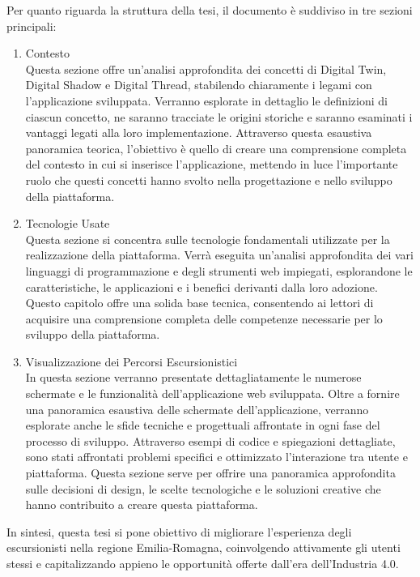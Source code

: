Per quanto riguarda la struttura della tesi, il documento è suddiviso in tre sezioni principali:
\newpage
\begin{enumerate}
    \item Contesto \\
    Questa sezione offre un'analisi approfondita dei concetti di Digital Twin, Digital Shadow e Digital Thread, stabilendo chiaramente i legami con l'applicazione sviluppata. Verranno esplorate in dettaglio le definizioni di ciascun concetto, ne saranno tracciate le origini storiche e saranno esaminati i vantaggi legati alla loro implementazione. Attraverso questa esaustiva panoramica teorica, l'obiettivo è quello di creare una comprensione completa del contesto in cui si inserisce l'applicazione, mettendo in luce l'importante ruolo che questi concetti hanno svolto nella progettazione e nello sviluppo della piattaforma.
    
    \item Tecnologie Usate \\
    Questa sezione si concentra sulle tecnologie fondamentali utilizzate per la realizzazione della piattaforma. Verrà eseguita un'analisi approfondita dei vari linguaggi di programmazione e degli strumenti web impiegati, esplorandone le caratteristiche, le applicazioni e i benefici derivanti dalla loro adozione. Questo capitolo offre una solida base tecnica, consentendo ai lettori di acquisire una comprensione completa delle competenze necessarie per lo sviluppo della piattaforma.
    
    \item Visualizzazione dei Percorsi Escursionistici \\
    In questa sezione verranno presentate dettagliatamente le numerose schermate e le funzionalità dell'applicazione web sviluppata.
    Oltre a fornire una panoramica esaustiva delle schermate dell'applicazione, verranno esplorate anche le sfide tecniche e progettuali affrontate in ogni fase del processo di sviluppo. Attraverso esempi di codice e spiegazioni dettagliate, sono stati affrontati problemi specifici e ottimizzato l'interazione tra utente e piattaforma.
    Questa sezione serve per offrire una panoramica approfondita sulle decisioni di design, le scelte tecnologiche e le soluzioni creative che hanno contribuito a creare questa piattaforma.
\end{enumerate}

In sintesi, questa tesi si pone obiettivo di migliorare l'esperienza degli escursionisti nella regione Emilia-Romagna, coinvolgendo attivamente gli utenti stessi e capitalizzando appieno le opportunità offerte dall'era dell'Industria 4.0.


